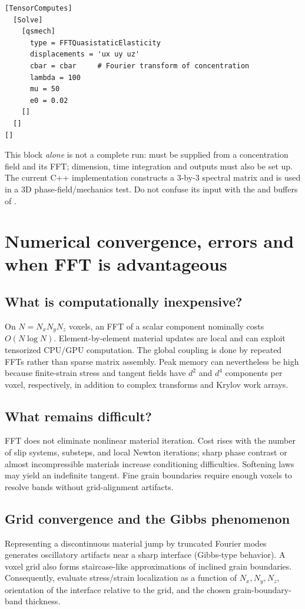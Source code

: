 \documentclass[11pt,a4paper]{article}
\newcommand{\code}[1]{\texttt{\detokenize{#1}}}
\begin{document}
\begin{lstlisting}[style=input,caption={Illustrative block for the separate homogeneous small-strain solver.}]
[TensorComputes]
  [Solve]
    [qsmech]
      type = FFTQuasistaticElasticity
      displacements = 'ux uy uz'
      cbar = cbar     # Fourier transform of concentration
      lambda = 100
      mu = 50
      e0 = 0.02
    []
  []
[]
\end{lstlisting}
This block \emph{alone} is not a complete run: \code{cbar} must be supplied from a concentration field and its FFT; dimension, time integration and outputs must also be set up. The current C++ implementation constructs a 3-by-3 spectral matrix and is used in a 3D phase-field/mechanics test. Do not confuse its input \code{lambda} with the \code{K} and \code{mu} buffers of \code{FFTMechanics}.

\section{Numerical convergence, errors and when FFT is advantageous}
\subsection{What is computationally inexpensive?}
On $N=N_xN_yN_z$ voxels, an FFT of a scalar component nominally costs $O(N\log N)$. Element-by-element material updates are local and can exploit tensorized CPU/GPU computation. The global coupling is done by repeated FFTs rather than sparse matrix assembly. Peak memory can nevertheless be high because finite-strain stress and tangent fields have $d^2$ and $d^4$ components per voxel, respectively, in addition to complex transforms and Krylov work arrays.

\subsection{What remains difficult?}
FFT does not eliminate nonlinear material iteration. Cost rises with the number of slip systems, substeps, and local Newton iterations; sharp phase contrast or almost incompressible materials increase conditioning difficulties. Softening laws may yield an indefinite tangent. Fine grain boundaries require enough voxels to resolve bands without grid-alignment artifacts.

\subsection{Grid convergence and the Gibbs phenomenon}
Representing a discontinuous material jump by truncated Fourier modes generates oscillatory artifacts near a sharp interface (Gibbs-type behavior). A voxel grid also forms staircase-like approximations of inclined grain boundaries. Consequently, evaluate stress/strain localization as a function of $N_x,N_y,N_z$, orientation of the interface relative to the grid, and the chosen grain-boundary-band thickness.
\end{document}
